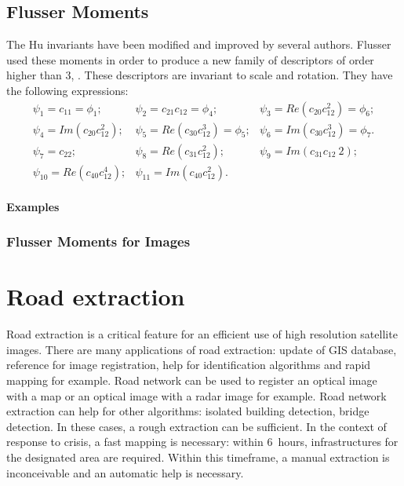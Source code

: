 \subsection{Flusser Moments}
\label{sec:FlusserMoments}
The Hu invariants have been modified and
improved by several authors. Flusser used these moments in order to
produce a new family of descriptors of order higher than 3,
\cite{flusserinv}. These descriptors are invariant to scale and
rotation. They have the following expressions:
\begin {equation}
\begin{array}{ccc}
\psi_1  = c_{11} = \phi_1; &  \psi_2  = c_{21}c_{12} = \phi_4; & \psi_3  = Re(c_{20}c_{12}^2) = \phi_6;\\
\psi_4  = Im(c_{20}c_{12}^2); & \psi_5  = Re(c_{30}c_{12}^3) = \phi_5;
& \psi_6  = Im(c_{30}c_{12}^3) = \phi_7.\\
\psi_7  = c_{22}; & \psi_8  = Re(c_{31}c_{12}^2); & \psi_9  = Im(c_{31}c_{12}~2);\\
\psi_{10} = Re(c_{40}c_{12}^4); & \psi_{11} = Im(c_{40}c_{12}^2). &\\

\end{array}
\end {equation}

\textbf{Examples}
\subsubsection{Flusser Moments for Images}

%

\section{Road extraction}
\label{sec:RoadExtraction}

Road extraction is a critical feature for an efficient use of high resolution satellite images. There are many applications of road extraction: update of GIS database, reference for image registration, help for identification algorithms and rapid mapping for example.  Road network can be used to register an optical image with a map or an optical image with a radar image for example. Road network extraction can help for other algorithms: isolated building detection, bridge detection. In these cases, a rough extraction can be sufficient. In the context of response to crisis, a fast mapping is necessary: within 6~hours, infrastructures for the designated area are required. Within this timeframe, a manual extraction is inconceivable and an automatic help is necessary.

